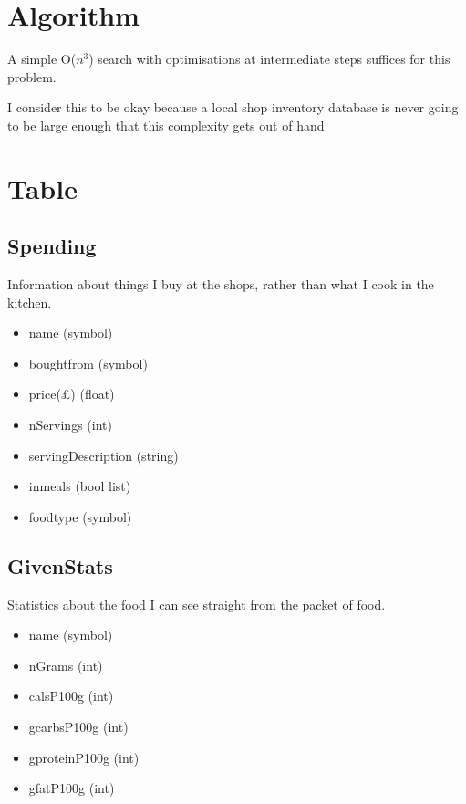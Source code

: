 \documentclass[a4paper]{article}
\begin{document}
\section{Algorithm}

A simple O($n^{3}$) search with optimisations at intermediate steps suffices 
for this problem.

I consider this to be okay because a local shop inventory database is 
never going to be large enough that this complexity gets out of hand.

\section{Table}

\subsection{Spending}

Information about things I buy at the shops, rather than what I cook in the 
kitchen.

\begin{itemize}
  \item name (symbol)
  \item boughtfrom (symbol)
  \item price(£) (float)
  \item nServings (int)
  \item servingDescription (string)
  \item inmeals (bool list)
  \item foodtype (symbol)
\end{itemize}

\subsection{GivenStats}

Statistics about the food I can see straight from the packet of food.

\begin{itemize}
  \item name (symbol)
  \item nGrams (int)
  \item calsP100g (int)
  \item gcarbsP100g (int)
  \item gproteinP100g (int)
  \item gfatP100g (int)
\end{itemize} 
  
\end{document}
